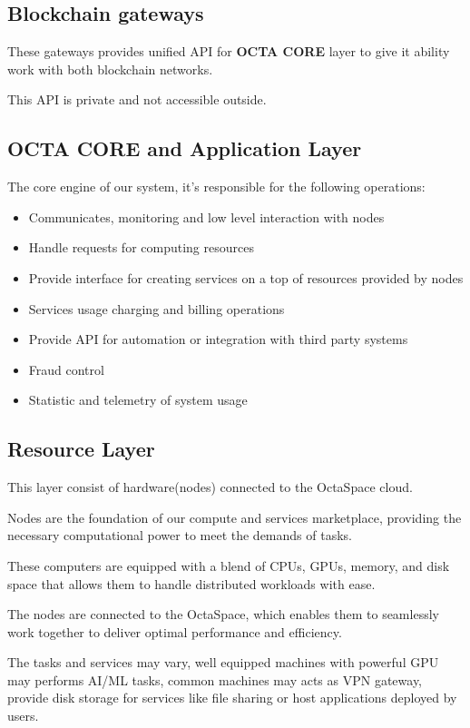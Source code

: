 \subsection{Blockchain gateways}

These gateways provides unified API for \textbf{OCTA CORE} layer to give it ability work with both blockchain networks.

This API is private and not accessible outside.

\subsection{OCTA CORE and Application Layer}

The core engine of our system, it's responsible for the following operations:

\begin{itemize}
    \item Communicates, monitoring and low level interaction with nodes
    \item Handle requests for computing resources
    \item Provide interface for creating services on a top of resources provided by nodes
    \item Services usage charging and billing operations
    \item Provide API for automation or integration with third party systems
    \item Fraud control
    \item Statistic and telemetry of system usage
\end{itemize}

\subsection{Resource Layer}

This layer consist of hardware(nodes) connected to the OctaSpace cloud.

Nodes are the foundation of our compute and services marketplace, providing the necessary computational power to meet the demands of tasks.

These computers are equipped with a blend of CPUs, GPUs, memory, and disk space that allows them to handle distributed workloads with ease.

The nodes are connected to the OctaSpace, which enables them to seamlessly work together to deliver optimal performance and efficiency.

The tasks and services may vary, well equipped machines with powerful GPU may performs AI/ML tasks,
common machines may acts as VPN gateway, provide disk storage for services like file sharing or host applications deployed by users.

